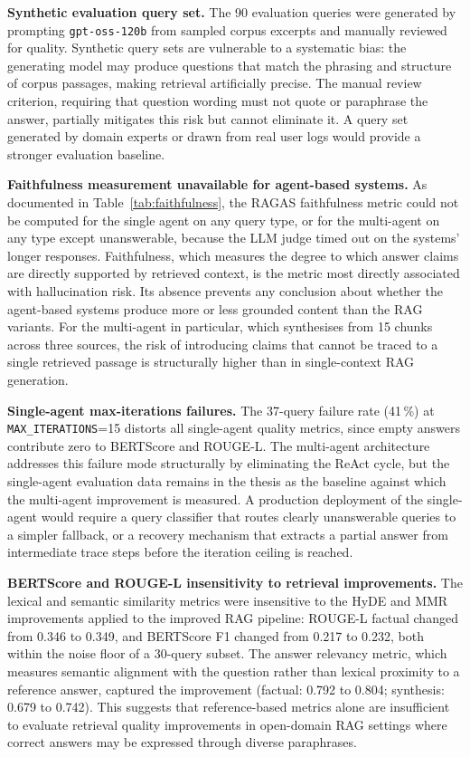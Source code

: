 \textbf{Synthetic evaluation query set.} The 90 evaluation queries were generated by prompting \texttt{gpt-oss-120b} from sampled corpus excerpts and manually reviewed for quality. Synthetic query sets are vulnerable to a systematic bias: the generating model may produce questions that match the phrasing and structure of corpus passages, making retrieval artificially precise. The manual review criterion, requiring that question wording must not quote or paraphrase the answer, partially mitigates this risk but cannot eliminate it. A query set generated by domain experts or drawn from real user logs would provide a stronger evaluation baseline.

\textbf{Faithfulness measurement unavailable for agent-based systems.} As documented in Table~\ref{tab:faithfulness}, the RAGAS faithfulness metric could not be computed for the single agent on any query type, or for the multi-agent on any type except unanswerable, because the LLM judge timed out on the systems' longer responses. Faithfulness, which measures the degree to which answer claims are directly supported by retrieved context, is the metric most directly associated with hallucination risk. Its absence prevents any conclusion about whether the agent-based systems produce more or less grounded content than the RAG variants. For the multi-agent in particular, which synthesises from 15 chunks across three sources, the risk of introducing claims that cannot be traced to a single retrieved passage is structurally higher than in single-context RAG generation.

\textbf{Single-agent max-iterations failures.} The 37-query failure rate (41\,\%) at \texttt{MAX\_ITERATIONS}=15 distorts all single-agent quality metrics, since empty answers contribute zero to BERTScore and ROUGE-L. The multi-agent architecture addresses this failure mode structurally by eliminating the ReAct cycle, but the single-agent evaluation data remains in the thesis as the baseline against which the multi-agent improvement is measured. A production deployment of the single-agent would require a query classifier that routes clearly unanswerable queries to a simpler fallback, or a recovery mechanism that extracts a partial answer from intermediate trace steps before the iteration ceiling is reached.

\textbf{BERTScore and ROUGE-L insensitivity to retrieval improvements.} The lexical and semantic similarity metrics were insensitive to the HyDE and MMR improvements applied to the improved RAG pipeline: ROUGE-L factual changed from 0.346 to 0.349, and BERTScore F1 changed from 0.217 to 0.232, both within the noise floor of a 30-query subset. The answer relevancy metric, which measures semantic alignment with the question rather than lexical proximity to a reference answer, captured the improvement (factual: 0.792 to 0.804; synthesis: 0.679 to 0.742). This suggests that reference-based metrics alone are insufficient to evaluate retrieval quality improvements in open-domain RAG settings where correct answers may be expressed through diverse paraphrases.

